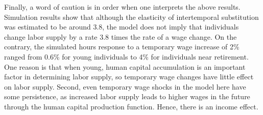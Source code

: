 \documentclass[\econtexRoot/ImaiKeane]{subfiles}
\begin{document}
 Finally, a word of caution is in order when one interprets the above results. Simulation results show that although the elasticity of intertemporal substitution was estimated to be around 3.8, the model does not imply that individuals change labor supply by a rate 3.8 times the rate of a wage change. On the contrary, the simulated hours response to a temporary wage increase of 2\% ranged from 0.6\% for young individuals to 4\% for individuals near retirement. One reason is that when young, human capital accumulation is an important factor in determining labor supply, so temporary wage changes have little effect on labor supply. Second, even temporary wage shocks in the model here have some persistence, as increased labor supply leads to higher wages in the future through the human capital production function. Hence, there is an income effect.
\end{document}
